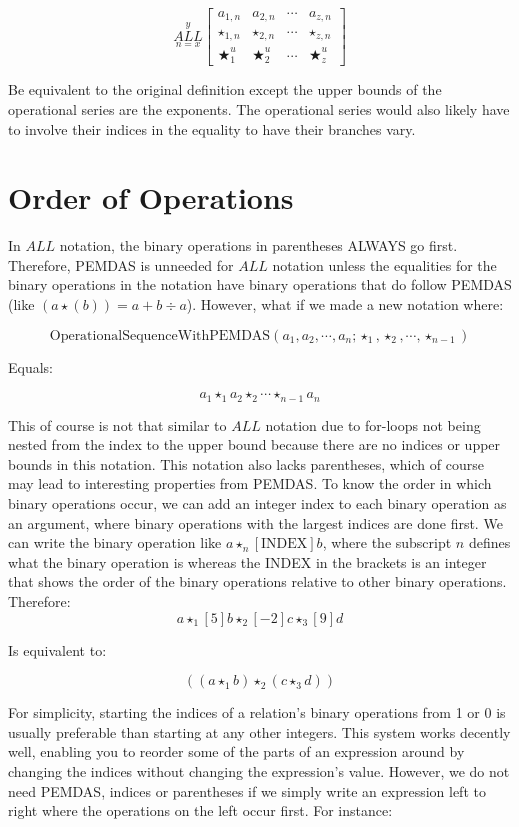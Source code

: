 \documentclass{article}
\begin{document}
$$\underset{n=x}{\overset{y}{ALL}}
\begin{bmatrix}
a_{1,n} & a_{2,n} & \cdots & a_{z,n} \\
\star_{1,n} & \star_{2,n} & \cdots & \star_{z,n} \\ \bigstar_{1}^u & \bigstar_{2}^u & \cdots & \bigstar_{z}^u
\end{bmatrix}$$

Be equivalent to the original definition except the upper bounds of the operational series are the exponents. The operational series would also likely have to involve their indices in the equality to have their branches vary.

\section{Order of Operations}

In $ALL$ notation, the binary operations in parentheses ALWAYS go first. Therefore, PEMDAS is unneeded for $ALL$ notation unless the equalities for the binary operations in the notation have binary operations that do follow PEMDAS (like $(a\star(b))=a+ b \div a$). However, what if we made a new notation where:

$$\text{OperationalSequenceWithPEMDAS}(a_1,a_2,\cdots,a_n;\star_1,\star_2,\cdots,\star_{n-1})$$

Equals:

$$a_1 \star_1 a_2 \star_2 \cdots \star_{n-1} a_n$$

This of course is not that similar to $ALL$ notation due to for-loops not being nested from the index to the upper bound because there are no indices or upper bounds in this notation. This notation also lacks parentheses, which of course may lead to interesting properties from PEMDAS. To know the order in which binary operations occur, we can add an integer index to each binary operation as an argument, where binary operations with the largest indices are done first. We can write the binary operation like $a \star_n [\text{INDEX}] b$, where the subscript $n$ defines what the binary operation is whereas the INDEX in the brackets is an integer that shows the order of the binary operations relative to other binary operations. Therefore:
$$a \star_1[5] b \star_2 [-2] c \star_3 [9] d$$

Is equivalent to:

$$((a \star_1 b) \star_2 (c\star_3d))$$

For simplicity, starting the indices of a relation’s binary operations from 1 or 0 is usually preferable than starting at any other integers. This system works decently well, enabling you to reorder some of the parts of an expression around by changing the indices without changing the expression’s value. However, we do not need PEMDAS, indices or parentheses if we simply write an expression left to right where the operations on the left occur first. For instance:
\end{document}
